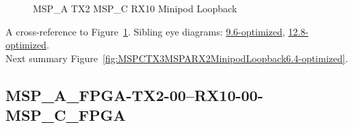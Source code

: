 \begin{figure}[h]
\begin{subfigure}{0.33\textwidth}
\hyperref[sec:MSPAFPGATX206RX1006MSPCFPGA6.4-optimized]{}
\end{subfigure}\hspace*{\fill}
\begin{subfigure}{0.33\textwidth}
\hyperref[sec:MSPAFPGATX207RX1007MSPCFPGA6.4-optimized]{}
\end{subfigure}\hspace*{\fill}
\begin{subfigure}{0.33\textwidth}
\hyperref[sec:MSPAFPGATX208RX1008MSPCFPGA6.4-optimized]{}
\end{subfigure}

\begin{subfigure}{0.33\textwidth}
\hyperref[sec:MSPAFPGATX209RX1009MSPCFPGA6.4-optimized]{}
\end{subfigure}\hspace*{\fill}
\begin{subfigure}{0.33\textwidth}
\hyperref[sec:MSPAFPGATX210RX1010MSPCFPGA6.4-optimized]{}
\end{subfigure}\hspace*{\fill}
\begin{subfigure}{0.33\textwidth}
\hyperref[sec:MSPAFPGATX211RX1011MSPCFPGA6.4-optimized]{}
\end{subfigure}

\caption{MSP\_A TX2 MSP\_C RX10 Minipod Loopback} \label{fig:MSPATX2MSPCRX10MinipodLoopback6.4-optimized}
\end{figure}

A cross-reference to Figure~\ref{fig:MSPATX2MSPCRX10MinipodLoopback6.4-optimized}.
Sibling eye diagrams: \hyperref[sec:MSPATX2MSPCRX10MinipodLoopback9.6-optimized]{9.6-optimized}, \hyperref[sec:MSPATX2MSPCRX10MinipodLoopback12.8-optimized]{12.8-optimized}. \\
Next summary Figure~\ref{fig:MSPCTX3MSPARX2MinipodLoopback6.4-optimized}.
\clearpage
% 
\subsection{MSP\_A\_FPGA-TX2-00--RX10-00-MSP\_C\_FPGA}\label{sec:MSPAFPGATX200RX1000MSPCFPGA6.4-optimized}

